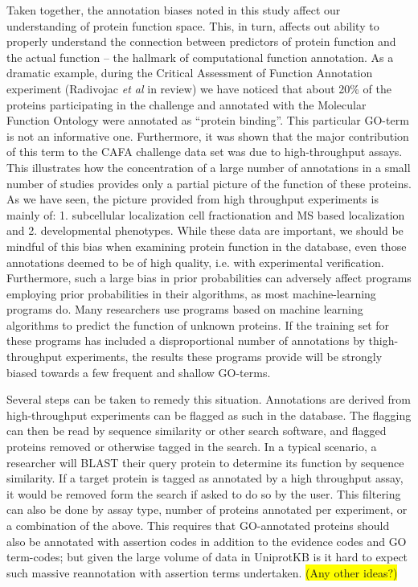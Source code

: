 \documentclass[12pt]{article}
\newcommand{\hilite}[1]{\colorbox{yellow}{#1}}
\begin{document}
Taken together, the annotation biases noted in this study affect our understanding of protein
function space. This, in turn, affects out ability to properly understand the connection between
predictors of protein function and the actual function -- the hallmark of computational function
annotation. As a dramatic example, during the Critical Assessment of Function Annotation
experiment (Radivojac \textit{et al} in review) we have noticed that about 20\% of the proteins
participating in the challenge and annotated with the Molecular Function Ontology were annotated
as ``protein binding''. This particular GO-term is not an informative one. Furthermore, it was
shown that the major contribution of this term to the CAFA challenge data set was due to
high-throughput assays. This illustrates how the concentration of a large number of annotations in
a small number of studies provides only a partial picture of the function of these proteins. As we
have seen, the picture provided from high throughput experiments is mainly of: 1. subcellular
localization cell fractionation and MS based localization and 2. developmental phenotypes. While
these data are important, we should be mindful of this bias when examining protein function in the
database, even those annotations deemed to be of high quality, i.e. with experimental
verification. Furthermore, such a large bias in prior probabilities can adversely affect programs
employing prior probabilities in their algorithms, as most machine-learning programs do. Many
researchers use programs based on machine learning algorithms to predict the function of unknown
proteins. If the training set for these programs has included a disproportional number of
annotations by thigh-throughput experiments, the results these programs provide will be strongly
biased towards a few frequent and shallow GO-terms.

Several steps can be taken to remedy this situation. Annotations are derived from
high-throughput experiments can be flagged as such in the database. The flagging can then be
read by sequence similarity or other search software, and flagged proteins removed or
otherwise tagged in the search.  In a typical scenario, a researcher will BLAST their query
protein to determine its function by sequence similarity. If a target protein is tagged as
annotated by a high throughput assay, it would be removed form the search if asked to do so
by the user. This filtering can also be done by assay type, number of proteins annotated per
experiment, or a combination of the above. This requires that GO-annotated proteins should
also be annotated with assertion codes in addition to the evidence codes and GO term-codes;
but given the large volume of data in UniprotKB is it hard to expect such massive
reannotation with assertion terms undertaken. \hilite{(Any other ideas?)}
\end{document}
